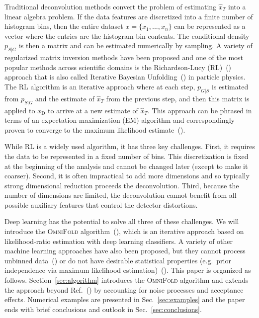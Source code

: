 \documentclass{article} %
\begin{document}
Traditional deconvolution methods convert the problem of estimating $\hat{x}_T$ into a linear algebra problem.  If the data features are discretized into a finite number of histogram bins, then the entire dataset $x=\{x_1,...,x_n\}$ can be represented as a vector where the entries are the histogram bin contents.  The conditional density $p_{S|G}$ is then a matrix and can be estimated numerically by sampling.  A variety of regularized matrix inversion methods have been proposed and one of the most popular methods across scientific domains is the Richardson-Lucy (RL)~(\cite{Richardson:72,1974AJ.....79..745L}) approach that is also called Iterative Bayesian Unfolding~(\cite{DAgostini:1994fjx}) in particle physics.  The RL algorithm is an iterative approach where at each step, $p_{G|S}$ is estimated from $p_{S|G}$ and the estimate of $\hat{x}_T$ from the previous step, and then this matrix is applied to $x_\text{D}$ to arrive at a new estimate of $\hat{x}_T$.  This approach can be phrased in terms of an expectation-maximization (EM) algorithm and correspondingly proven to converge to the maximum likelihood estimate~(\cite{shepp1982maximum}).

While RL is a widely used algorithm, it has three key challenges.   First, it requires the data to be represented in a fixed number of bins.   This discretization is fixed at the beginning of the analysis and cannot be changed later (except to make it coarser).   Second, it is often impractical to add more dimensions and so typically strong dimensional reduction proceeds the deconvolution.  Third, because the number of dimensions are limited, the deconvolution cannot benefit from all possible auxiliary features that control the detector distortions.   

Deep learning has the potential to solve all three of these challenges.  We will introduce the \textsc{OmniFold} algorithm~(\cite{Andreassen:2019cjw}), which is an iterative approach based on likelihood-ratio estimation with deep learning classifiers.  A variety of other machine learning approaches have also been proposed, but they cannot process unbinned data~(\cite{Gagunashvili:2010zw,Glazov:2017vni,Datta:2018mwd,bunse2018unification}) or do not have desirable statistical properties (e.g.\ prior independence via maximum likelihood estimation)~(\cite{Bellagente:2019uyp,Bellagente:2020piv}).  This paper is organized as follows.  Section~\ref{sec:algorithm} introduces the \textsc{OmniFold} algorithm and extends the approach beyond Ref.~(\cite{Andreassen:2019cjw}) by accounting for noise processes and acceptance effects.    Numerical examples are presented in Sec.~\ref{sec:examples} and the paper ends with brief conclusions and outlook in Sec.~\ref{sec:conclusions}.
\end{document}

